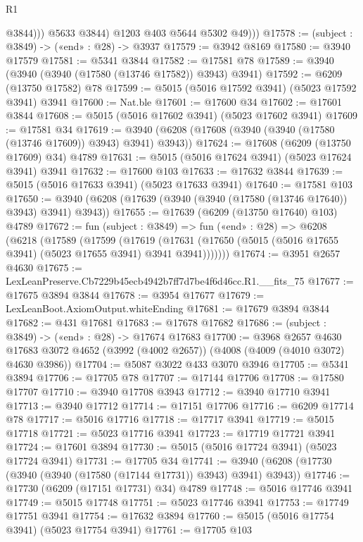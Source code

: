 \begin{lexlean}{R1}
\begin{coremodule}
                  @3844)))
            @5633
            @3844)
          @1203
          @403
          @5644
          @5302
          @49)))
@17578 := (subject : @3849) -> («end» : @28) -> @3937
@17579 := @3942 @8169
@17580 := @3940 @17579
@17581 := @5341 @3844
@17582 := @17581 @78
@17589 := @3940 (@3940 (@3940 (@17580 (@13746 @17582)) @3943) @3941)
@17592 := @6209 (@13750 @17582) @78
@17599 := @5015 (@5016 @17592 @3941) (@5023 @17592 @3941) @3941
@17600 := Nat.ble
@17601 := @17600 @34
@17602 := @17601 @3844
@17608 := @5015 (@5016 @17602 @3941) (@5023 @17602 @3941)
@17609 := @17581 @34
@17619 := @3940 (@6208 (@17608 (@3940 (@3940 (@17580 (@13746 @17609)) @3943) @3941) @3943))
@17624 := @17608 (@6209 (@13750 @17609) @34) @4789
@17631 := @5015 (@5016 @17624 @3941) (@5023 @17624 @3941) @3941
@17632 := @17600 @103
@17633 := @17632 @3844
@17639 := @5015 (@5016 @17633 @3941) (@5023 @17633 @3941)
@17640 := @17581 @103
@17650 := @3940 (@6208 (@17639 (@3940 (@3940 (@17580 (@13746 @17640)) @3943) @3941) @3943))
@17655 := @17639 (@6209 (@13750 @17640) @103) @4789
@17672 := fun (subject : @3849) =>
  fun («end» : @28) =>
  @6208
    (@6218
      (@17589
        (@17599
          (@17619
            (@17631 (@17650 (@5015 (@5016 @17655 @3941) (@5023 @17655 @3941) @3941 @3941)))))))
@17674 := @3951 @2657 @4630
@17675 := LexLeanPreserve.Cb7229b45ecb4942b7ff7d7be4f6d46cc.R1.__fits_75
@17677 := @17675 @3894 @3844
@17678 := @3954 @17677
@17679 := LexLeanBoot.AxiomOutput.whiteEnding
@17681 := @17679 @3894 @3844
@17682 := @431 @17681
@17683 := @17678 @17682
@17686 := (subject : @3849) -> («end» : @28) -> @17674 @17683
@17700 := @3968
    @2657
    @4630
    @17683
    @3072
    @4652
    (@3992 (@4002 @2657))
    (@4008 (@4009 (@4010 @3072) @4630 @3986))
@17704 := @5087 @3022 @433 @3070 @3946
@17705 := @5341 @3894
@17706 := @17705 @78
@17707 := @17144 @17706
@17708 := @17580 @17707
@17710 := @3940 @17708 @3943
@17712 := @3940 @17710 @3941
@17713 := @3940 @17712
@17714 := @17151 @17706
@17716 := @6209 @17714 @78
@17717 := @5016 @17716
@17718 := @17717 @3941
@17719 := @5015 @17718
@17721 := @5023 @17716 @3941
@17723 := @17719 @17721 @3941
@17724 := @17601 @3894
@17730 := @5015 (@5016 @17724 @3941) (@5023 @17724 @3941)
@17731 := @17705 @34
@17741 := @3940 (@6208 (@17730 (@3940 (@3940 (@17580 (@17144 @17731)) @3943) @3941) @3943))
@17746 := @17730 (@6209 (@17151 @17731) @34) @4789
@17748 := @5016 @17746 @3941
@17749 := @5015 @17748
@17751 := @5023 @17746 @3941
@17753 := @17749 @17751 @3941
@17754 := @17632 @3894
@17760 := @5015 (@5016 @17754 @3941) (@5023 @17754 @3941)
@17761 := @17705 @103

\end{coremodule}
\end{lexlean}
